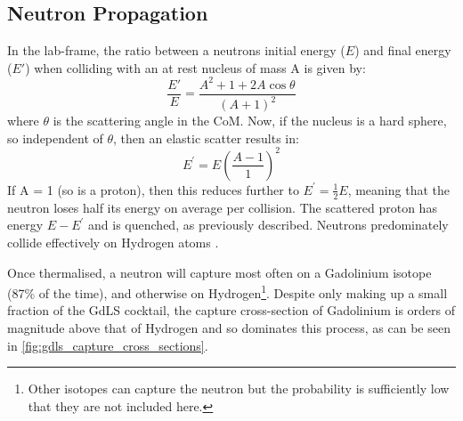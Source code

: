 \subsection{Neutron Propagation}
\par
In the lab-frame, the ratio between a neutrons initial energy ($E$) and final energy ($E'$) when colliding with an at rest nucleus of mass A is given by:
\begin{equation}
    \frac{E'}{E} = \frac{A^2 + 1 + 2A\cos{\theta}}{(A + 1)^2}
\end{equation}
where $\theta$ is the scattering angle in the CoM.
Now, if the nucleus is a hard sphere, so independent of $\theta$, then an elastic scatter results in:
\begin{equation}
    E^{'} = E(\frac{A-1}{1})^{2}
\end{equation}
If A = 1 (so is a proton), then this reduces further to $E^{'} = \frac{1}{2}E$, meaning that the neutron loses half its energy on average per collision.
The scattered proton has energy $E - E^{'}$ and is quenched, as previously described.
Neutrons predominately collide effectively on Hydrogen atoms \cite{neutron_thermalisation_and_capture_ref}.

\par
Once thermalised, a neutron will capture most often on a Gadolinium isotope (87\% of the time), and otherwise on Hydrogen\footnote{Other isotopes can capture the neutron but the probability is sufficiently low that they are not included here.}.
Despite only making up a small fraction of the GdLS cocktail, the capture cross-section of Gadolinium is orders of magnitude above that of Hydrogen and so dominates this process, as can be seen in \autoref{fig:gdls_capture_cross_sections}.




